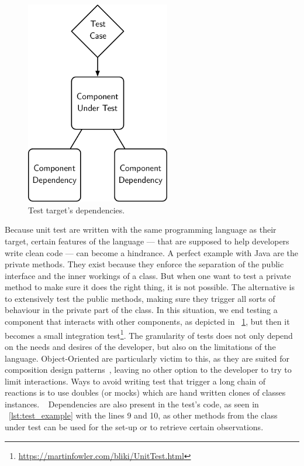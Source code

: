 \documentclass[a4paper,11pt]{sdm_internship}
\newcommand{\rephrase}[1]{\colorbox{BlueViolet!60}{\textcolor{white}{\textbf{$\sim$#1}}}}
\theoremstyle{definition}
\begin{document}
\begin{figure}
  \centering
  \includegraphics[width=17em]{component_dependency}
  \caption{Test target's dependencies.}%
  \label{fig:component_dependency}
\end{figure}

Because unit test are written with the same programming language as their target, certain features of the language --- that are supposed to help developers write clean code --- can become a hindrance.
A perfect example with Java are the private methods.
They exist because they enforce the separation of the public interface and the inner workings of a class.
But when one want to test a private method to make sure it does the right thing, it is not possible.
The alternative is to extensively test the public methods, making sure they trigger all sorts of behaviour in the private part of the class.
In this situation, we end testing a component that interacts with other components, as depicted in \figurename~\ref{fig:component_dependency}, but then it becomes a small integration test\footnote{\url{https://martinfowler.com/bliki/UnitTest.html}}.
The granularity of tests does not only depend on the needs and desires of the developer, but also on the limitations of the language.
Object-Oriented are particularly victim to this, as they are suited for composition design patterns~\cite{wolfgang1994design}, leaving no other option to the developer to try to limit interactions.
Ways to avoid writing test that trigger a long chain of reactions is to use doubles (or mocks) which are hand written clones of classes instances.\rephrase{}
Dependencies are also present in the test's code, as seen in \listingname~\ref{lst:test_example} with the lines 9 and 10, as other methods from the class under test can be used for the set-up or to retrieve certain observations.
\end{document}
